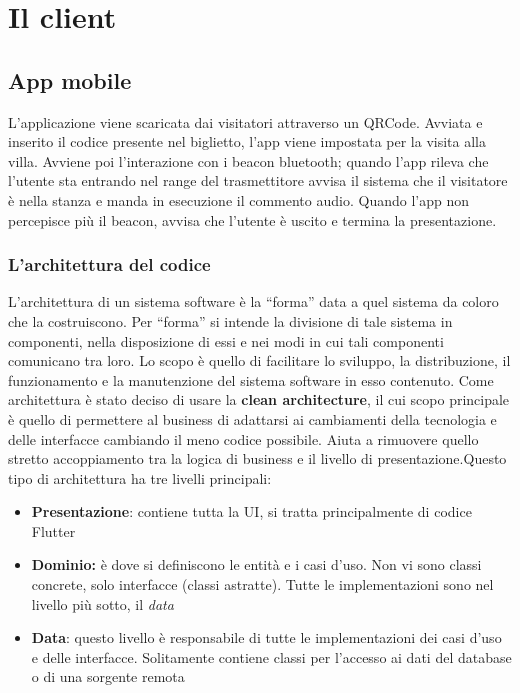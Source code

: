 \documentclass[12pt]{article}
\begin{document}
\section{Il client}
\subsection{App mobile}
L'applicazione viene scaricata dai visitatori attraverso un QRCode. Avviata
e inserito il codice presente nel biglietto, l’app viene impostata per la visita alla villa. Avviene poi l'interazione con i beacon bluetooth; quando l’app rileva che l'utente sta entrando nel range del trasmettitore avvisa il sistema che il visitatore è nella stanza e manda in esecuzione il commento audio. Quando l’app non percepisce più il beacon, avvisa  che l’utente è uscito e termina la presentazione.

\subsubsection{L'architettura del codice}
L’architettura di un sistema software è la “forma” data a quel sistema da coloro che la costruiscono. Per  “forma” si intende la divisione di tale sistema in componenti, nella disposizione di essi e nei modi in cui tali componenti comunicano tra loro. Lo scopo è  quello di facilitare lo sviluppo, la distribuzione, il funzionamento e la manutenzione del sistema software in esso contenuto.\cite{architettura_codice}
Come architettura è stato deciso di usare la \textbf{clean architecture}, il cui scopo principale è quello di permettere al business di adattarsi ai cambiamenti della tecnologia e delle interfacce cambiando il meno codice possibile. Aiuta a rimuovere quello stretto accoppiamento tra la logica di business e il livello di presentazione.\cite{architettura_introduction}\clearpage Questo tipo di architettura ha tre livelli principali:
\begin{itemize}
    \item \textbf{Presentazione}: contiene tutta la UI, si tratta principalmente di codice Flutter
    \item \textbf{Dominio:} è dove si definiscono le entità e i casi d'uso. Non vi sono classi concrete, solo interfacce (classi astratte). Tutte le implementazioni sono nel livello più sotto, il \emph{data} 
    \item \textbf{Data}: questo livello è responsabile di tutte le implementazioni dei casi d'uso e delle interfacce. Solitamente contiene classi per l'accesso ai dati del database o di una sorgente remota
\end{itemize}
\end{document}
